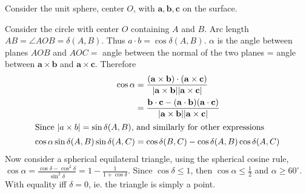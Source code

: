\documentclass[a4paper]{article}
\begin{document}
Consider the unit sphere, center $O$, with $\mathbf{a, b, c}$ on the surface.

\begin{center}
\end{center}

Consider the circle with center $O$ containing $A$ and $B$. Arc length $AB = \angle AOB = \delta(A, B)$. Thus $a\cdot b = \cos \delta(A, B)$. $\alpha$ is the angle between planes $AOB$ and $AOC = $ angle between the normal of the two planes = angle between $\mathbf{a\times b}$ and $\mathbf{a \times c}$. Therefore
\begin{align*}
  \cos \alpha &= \mathbf{\frac{(a\times b)\cdot(a\times c)}{|a\times b||a\times c|}}\\
  &= \mathbf{\frac{b\cdot c - (a\cdot b)(a\cdot c)}{|a\times b||a\times c|}}\\
  \intertext{Since $|a\times b| = \sin\delta(A, B)$, and similarly for other expressions}
  \cos\alpha\sin\delta(A, B)\sin\delta(A, C) &= \cos\delta(B, C) - \cos\delta(A, B)\cos\delta(A, C)
\end{align*}
Now consider a spherical equilateral triangle, using the spherical cosine rule, $\cos\alpha = \frac{\cos\delta - \cos^2\delta}{\sin^2\delta} = 1 - \frac{1}{1 + \cos\delta}$. Since $\cos\delta\leq 1$, then $\cos\alpha\leq \frac{1}{2}$ and $\alpha \geq 60^\circ$. With equality iff $\delta = 0$, ie. the triangle is simply a point.
\end{document}
